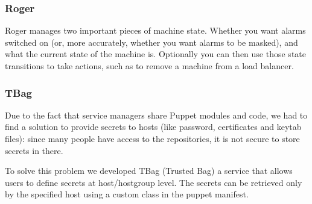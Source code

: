 \subsubsection{Roger}

Roger manages two important pieces of machine state. Whether you want
alarms switched on (or, more accurately, whether you want alarms to be
masked), and what the current state of the machine is. Optionally you can
then use those state transitions to take actions, such as to remove
a machine from a load balancer.

\subsubsection{TBag}

Due to the fact that service managers share Puppet modules and code, we
had to find a solution to provide secrets to hosts (like password,
certificates and keytab files): since many people have access to the
repositories, it is not secure to store secrets in there.

To solve this problem we developed TBag (Trusted Bag) a service that
allows users to define secrets at host/hostgroup level. The secrets can be
retrieved only by the specified host using a custom class in the puppet
manifest. 

